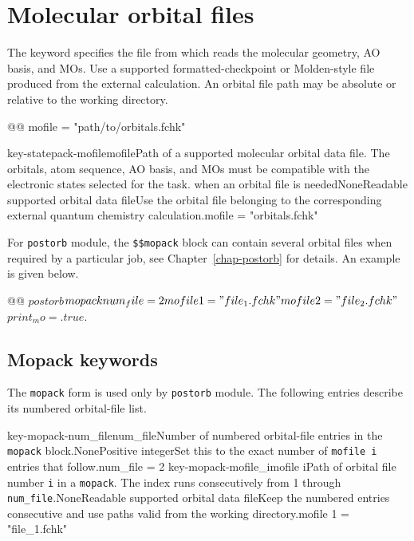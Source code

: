 \section{Molecular orbital files}\label{sec-mofiles}
The  keyword specifies the file from which \progname{} reads the molecular geometry, AO basis, and MOs. Use a supported formatted-checkpoint or Molden-style file produced from the external calculation.
An orbital file path may be absolute or relative to the working directory.
\begin{lst-script}[escapechar=@]
@@
mofile = "path/to/orbitals.fchk"
\end{lst-script}
\keyword
{key-statepack-mofile}{mofile}{Path of a supported molecular orbital data file. The orbitals, atom sequence, AO basis, and MOs must be compatible with the electronic states selected for the task.}{\OpRequired{} when an orbital file is needed}{\OpString}{None}{Readable supported orbital data file}{Use the orbital file belonging to the corresponding external quantum chemistry calculation.}{mofile = "orbitals.fchk"}

For \texttt{postorb} module, the \texttt{\$\$mopack} block can contain several orbital files when required by a particular job, see Chapter~\ref{chap-postorb} for details.
An example is given below.
\begin{lst-script}[escapechar=@]
@@
$postorb
  $$mopack
    num_file = 2
    mofile 1 = "file_1.fchk"
    mofile 2 = "file_2.fchk"
  $$
  print_mo = .true.
$
\end{lst-script}

\subsection*{Mopack keywords}
The \texttt{mopack} form is used only by \texttt{postorb} module. The following entries describe its numbered orbital-file list.
\begin{keywordoverview}
\end{keywordoverview}
\keyword
{key-mopack-num_file}{num\_file}{Number of numbered orbital-file entries in the \texttt{mopack} block.}{\OpRequired}{\OpInt}{None}{Positive integer}{Set this to the exact number of \texttt{mofile i} entries that follow.}{num\_file = 2}
\keyword
{key-mopack-mofile_i}{mofile i}{Path of orbital file number \texttt{i} in a \texttt{mopack}. The index runs consecutively from 1 through \texttt{num\_file}.}{\OpRequired}{\OpString}{None}{Readable supported orbital data file}{Keep the numbered entries consecutive and use paths valid from the working directory.}{mofile 1 = "file\_1.fchk"}
